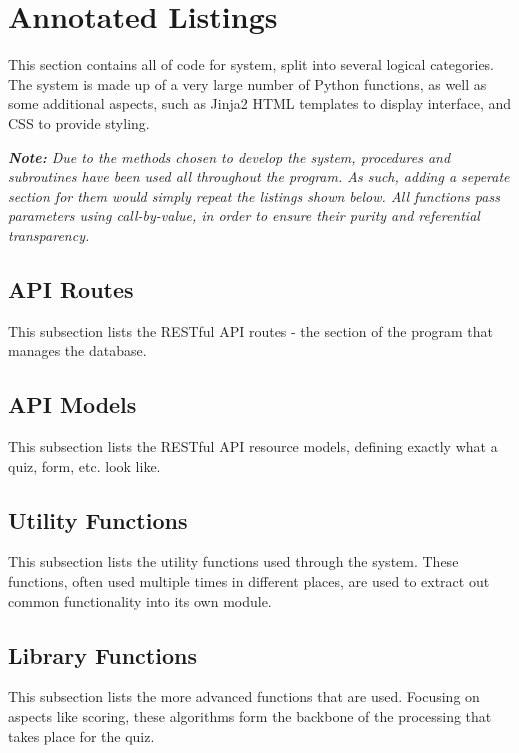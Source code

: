 \section{Annotated Listings}
This section contains all of code for system, split into several logical categories. The system is made up of a very large number of Python functions, as well as some additional aspects, such as Jinja2 HTML templates to display interface, and CSS to provide styling.

\textit{\textbf{Note:} Due to the methods chosen to develop the system, procedures and subroutines have been used all throughout the program. As such, adding a seperate section for them would simply repeat the listings shown below. All functions pass parameters using call-by-value, in order to ensure their purity and  referential transparency.}

\subsection{API Routes} %
\label{sub:api_routes}
This subsection lists the RESTful API routes - the section of the program that manages the database.


\subsection{API Models} %
\label{sub:api_models}
This subsection lists the RESTful API resource models, defining exactly what a quiz, form, etc. look like.


\subsection{Utility Functions} %
\label{sub:utility_functions}
This subsection lists the utility functions used through the system. These functions, often used multiple times in different places, are used to extract out common functionality into its own module.


\subsection{Library Functions} %
\label{sub:library_functions}
This subsection lists the more advanced functions that are used. Focusing on aspects like scoring, these algorithms form the backbone of the processing that takes place for the quiz.


